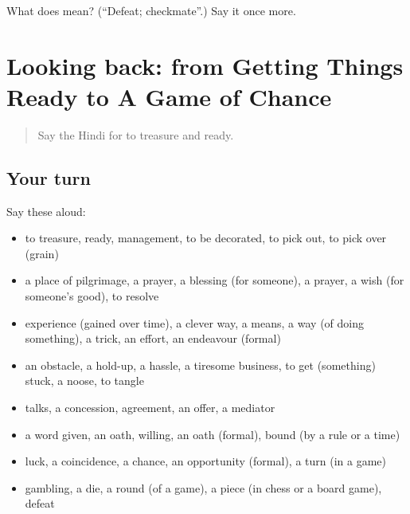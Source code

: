 \begin{tcolorbox}[breakable,colback=teal!4,colframe=teal!35!black,title={Before you move on}]
What does  mean? (\textquotedblleft{}Defeat; checkmate\textquotedblright{}.) Say it once more.
\end{tcolorbox}
\section[(dialogue)]{Looking back: from Getting Things Ready to A Game of Chance}

\label{lesson:HI-R545-review-538-545}



\begin{quote}
Say the Hindi for to treasure and ready.
\end{quote}

\subsection*{Your turn}
Say these aloud:

\begin{itemize}
\raggedright
  \item to treasure, ready, management, to be decorated, to pick out, to pick over (grain)
  \item a place of pilgrimage, a prayer, a blessing (for someone), a prayer, a wish (for someone's good), to resolve
  \item experience (gained over time), a clever way, a means, a way (of doing something), a trick, an effort, an endeavour (formal)
  \item an obstacle, a hold-up, a hassle, a tiresome business, to get (something) stuck, a noose, to tangle
  \item talks, a concession, agreement, an offer, a mediator
  \item a word given, an oath, willing, an oath (formal), bound (by a rule or a time)
  \item luck, a coincidence, a chance, an opportunity (formal), a turn (in a game)
  \item gambling, a die, a round (of a game), a piece (in chess or a board game), defeat
\end{itemize}

